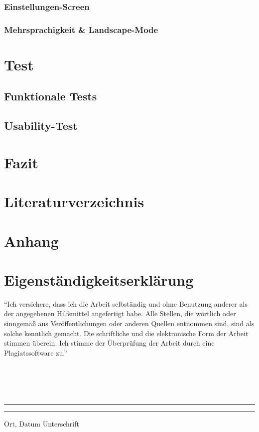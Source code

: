\documentclass[12pt, a4paper, oneside]{article}
\begin{document}
\subsubsection{Einstellungen-Screen}
\subsubsection{Mehrsprachigkeit \& Landscape-Mode}
\section{Test}
\subsection{Funktionale Tests}
\subsection{Usability-Test}
\newpage

\section{Fazit}

\section{Literaturverzeichnis}

\renewcommand{\refname}{} 


\newpage


\appendix %
\section{Anhang}

\newpage

\section{Eigenständigkeitserklärung}
``Ich versichere, dass ich die Arbeit selbständig und ohne Benutzung anderer als der angegebenen Hilfsmittel angefertigt habe. Alle Stellen, die wörtlich oder sinngemäß aus Veröffentlichungen oder anderen Quellen entnommen sind, sind als solche kenntlich gemacht. Die schriftliche und die elektronische Form der Arbeit stimmen überein. Ich stimme der Überprüfung der Arbeit durch eine Plagiatssoftware zu.''
\paragraph{}$~~$\\
\paragraph{}$~~$\\
\vspace{50pt} 
\noindent\rule{5cm}{.4pt}\hfill\rule{5cm}{.4pt}\par 
\noindent Ort, Datum \hfill Unterschrift 
\end{document}
